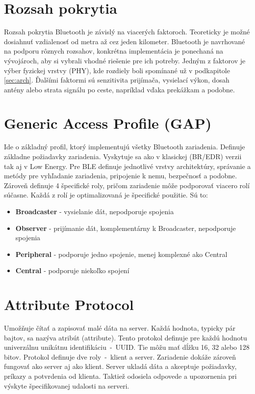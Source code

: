 \section{Rozsah pokrytia}

Rozsah pokrytia Bluetooth je závislý na viacerých faktoroch. Teoreticky je možné dosiahnuť vzdialenosť od metra až cez jeden kilometer. Bluetooth je navrhované na podporu rôznych rozsahov, konkrétna implementácia je ponechaná na vývojároch, aby si vybrali vhodné riešenie pre ich potreby. Jedným z faktorov je výber fyzickej vrstvy (PHY), kde rozdiely boli spomínané už v podkapitole \ref{sec:arch}. Ďalšími faktormi sú senzitivita prijímača, vysielací výkon, dosah antény alebo strata signálu po ceste, napríklad vďaka prekážkam a podobne.\cite{bluetooth}

\section{Generic Access Profile (GAP)}\label{sec:gap}

Ide o základný profil, ktorý implementujú všetky Bluetooth zariadenia. Definuje základne požiadavky zariadenia. Vyskytuje sa ako v klasickej (BR/EDR) verzii tak aj v Low Energy. Pre BLE definuje jednotlivé vrstvy architektúry, správanie a metódy pre vyhľadanie zariadenia, pripojenie k nemu, bezpečnosť a podobne.
Zároveň definuje 4 špecifické roly, pričom zariadenie môže podporovať viacero rolí súčasne. Každá z rolí je optimalizovaná je špecifické použitie. Sú to:
\begin{itemize}
    \item \textbf{Broadcaster} - vysielanie dát, nepodporuje spojenia
    \item \textbf{Observer} - prijímanie dát, komplementárny k Broadcaster, nepodporuje spojenia
    \item \textbf{Peripheral} - podporuje jedno spojenie, menej komplexné ako Central
    \item \textbf{Central} - podporuje niekoľko spojení\cite{bluetooth}
\end{itemize}

\section{Attribute Protocol}

Umožňuje čítať a zapisovať malé dáta na server. Každá hodnota, typicky pár bajtov, sa nazýva atribút (attribute). Tento protokol definuje pre každú hodnotu univerzálnu unikátnu identifikáciu~-~UUID. Tie môžu mať dĺžku 16, 32 alebo 128 bitov.
Protokol definuje dve roly~-~klient a server. Zariadenie dokáže zároveň fungovať ako server aj ako klient. Server ukladá dáta a akceptuje požiadavky, príkazy a potvrdenia od klienta. Taktiež odosiela odpovede a upozornenia pri výskyte špecifikovanej udalosti na serveri.\cite{bluetooth}

